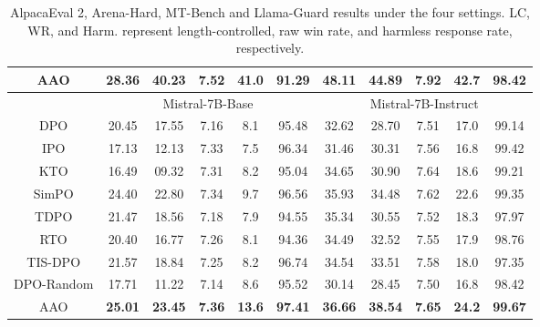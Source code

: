 \begin{table}[]
\begin{tabular}{cccccc|ccccc}
\hline
AAO                      & \textbf{28.36}          & \textbf{40.23}          & \textbf{7.52}    & \textbf{41.0}      & \textbf{91.29}       & \textbf{48.11}          & \textbf{44.89}          & \textbf{7.92}    & \textbf{42.7}      & \textbf{98.42} 
      \\ \hline
                         & \multicolumn{5}{c|}{\cellcolor[HTML]{CBCEFB}Mistral-7B-Base}          & \multicolumn{5}{c}{\cellcolor[HTML]{CBCEFB}Mistral-7B-Instruct}       \\ \hline
DPO                      & 20.45          & 17.55          & 7.16    & 8.1      & 95.48       & 32.62          & 28.70          & 7.51    & 17.0      & 99.14       \\
IPO                      & 17.13          & 12.13          & 7.33    & 7.5      & 96.34       & 31.46          & 30.31          & 7.56    & 16.8      & 99.42       \\
KTO                      & 16.49          & 09.32          & 7.31    & 8.2      & 95.04       & 34.65          & 30.90          & 7.64    & 18.6      & 99.21       \\
SimPO                    & 24.40          & 22.80          & 7.34    & 9.7      & 96.56       & 35.93          & 34.48          & 7.62    & 22.6      & 99.35       \\
TDPO                     & 21.47          & 18.56          & 7.18    & 7.9      & 94.55       & 35.34          & 30.55          & 7.52    & 18.3      & 97.97       \\
RTO                      & 20.40          & 16.77          & 7.26    & 8.1      & 94.36       & 34.49          & 32.52          & 7.55    & 17.9      & 98.76       \\
TIS-DPO                  & 21.57          & 18.84          & 7.25    & 8.2      & 96.74       & 34.54          & 33.51          & 7.58    & 18.0      & 97.35       \\
DPO-Random                  & 17.71          & 11.22          & 7.14    & 8.6      & 95.52       & 30.14         & 28.45          & 7.50    & 16.8      & 98.42       \\
\hline
AAO                      & \textbf{25.01}          & \textbf{23.45}          & \textbf{7.36}    & \textbf{13.6}      & \textbf{97.41}       & \textbf{36.66}          & \textbf{38.54}          & \textbf{7.65}    & \textbf{24.2}      & \textbf{99.67}
      \\ \hline
\end{tabular}
\caption{AlpacaEval 2, Arena-Hard, MT-Bench and Llama-Guard results under the four settings. LC, WR, and Harm. represent length-controlled, raw win rate, and harmless response rate, respectively.}
\label{tab:results}
\end{table}
